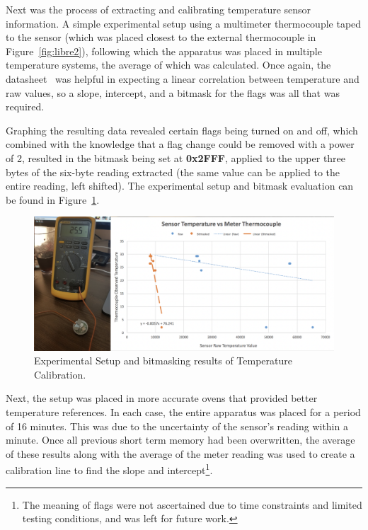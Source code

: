Next was the process of extracting and calibrating temperature sensor information. A simple experimental setup using a multimeter thermocouple taped to the sensor (which was placed closest to the external thermocouple in Figure~\ref{fig:libre2}), following which the apparatus was placed in multiple temperature systems, the average of which was calculated. Once again, the datasheet~\cite{noauthor_rf430frl152h_nodate} was helpful in expecting a linear correlation between temperature and raw values, so a slope, intercept, and a bitmask for the flags was all that was required.

Graphing the resulting data revealed certain flags being turned on and off, which combined with the knowledge that a flag change could be removed with a power of 2, resulted in the bitmask being set at \textbf{0x2FFF}, applied to the upper three bytes of the six-byte reading extracted (the same value can be applied to the entire reading, left shifted). The experimental setup and bitmask evaluation can be found in Figure~\ref{fig:tempcalsetup}.

\begin{figure}[ht]
\centering\includegraphics[width=1.0\linewidth]{images/tempcalsetup.png}
\caption{Experimental Setup and bitmasking results of Temperature Calibration.}
\label{fig:tempcalsetup}
\end{figure}

Next, the setup was placed in more accurate ovens that provided better temperature references. In each case, the entire apparatus was placed for a period of 16 minutes. This was due to the uncertainty of the sensor's reading within a minute. Once all previous short term memory had been overwritten, the average of these results along with the average of the meter reading was used to create a calibration line to find the slope and intercept\footnote{The meaning of flags were not ascertained due to time constraints and limited testing conditions, and was left for future work.}. 

